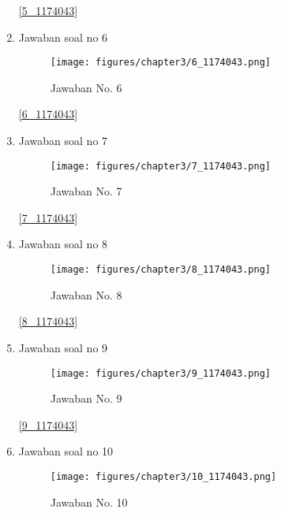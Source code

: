\begin{enumerate}
				\ref{5_1174043}
				
			\item Jawaban soal no 6
				
				
				\begin{figure} [ht]
					\centerline{\texttt{[image: figures/chapter3/6\_1174043.png]}}
					\caption{Jawaban No. 6}
					\label{6}
				\end{figure}

				\ref{6_1174043}
				
			\item Jawaban soal no 7
				
				
				\begin{figure} [ht]
					\centerline{\texttt{[image: figures/chapter3/7\_1174043.png]}}
					\caption{Jawaban No. 7}
					\label{7}
				\end{figure}

				\ref{7_1174043}
				
			\item Jawaban soal no 8
				
				
				\begin{figure} [ht]
					\centerline{\texttt{[image: figures/chapter3/8\_1174043.png]}}
					\caption{Jawaban No. 8}
					\label{8}
				\end{figure}

				\ref{8_1174043}
				
			\item Jawaban soal no 9
				
				
				\begin{figure} [ht]
					\centerline{\texttt{[image: figures/chapter3/9\_1174043.png]}}
					\caption{Jawaban No. 9}
					\label{9}
				\end{figure}

				\ref{9_1174043}
				
			\item Jawaban soal no 10
				
				
				\begin{figure} [ht]
					\centerline{\texttt{[image: figures/chapter3/10\_1174043.png]}}
					\caption{Jawaban No. 10}
					\label{10}
				\end{figure}


\end{enumerate}
